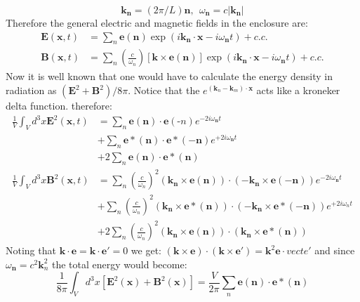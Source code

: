 \documentclass[9pt,a4paper, twocolumn]{article}
\newcommand{\vect}[1]{\textbf{#1}}
\begin{document}
        \begin{equation}
            \vect k_{\vect n} = (2\pi/L)\vect n, \ \ \omega_{\vect n} = c |\vect k_{\vect n}|
        \end{equation}
        Therefore the general electric and magnetic fields in the enclosure are:
        \begin{align}
            \vect E(\vect x, t) &= \sum_n \vect e(\vect n) \exp(i\vect k_{\vect n}\cdot \vect x - i\omega_{\vect n}t) + c.c.\\
            \vect B(\vect x,t) &= \sum_n \left(\frac c{\omega_n}\right)\left[\vect k\times \vect e(\vect n)\right]\exp(i\vect k_{\vect n}\cdot \vect x - i\omega_{\vect n} t) + c.c.
        \end{align}
        Now it is well known that one would have to calculate the energy density in radiation as $(\vect E^2 + \vect B^2)/8\pi$. Notice that the $e^{(\vect k_n - \vect k_m)\cdot \vect x}$ acts like a kroneker delta function. therefore:
        \begin{align*}
            \frac 1V \int_V d^3x \vect E^2(\vect x , t) &= \sum_n \vect e(\vect n) \cdot \vect e(\vect -n) e^{-2i\omega_{\vect n}t}\\
            & + \sum_n \vect e*(\vect n)\cdot \vect e*(-\vect n)e^{+2i\omega_{\vect n}t}\\
            & + 2\sum_n \vect e(\vect n)\cdot \vect e*(\vect n)\\
            \frac1V\int_V d^3x\vect B^2(\vect x, t) &= \sum_n \left( \frac c{\omega_n}\right)^2 (\vect k_{\vect n}\times \vect e(\vect n))\cdot (-\vect k_{\vect n}\times\vect e(-\vect n))e^{-2i\omega_{\vect n}t}\\
            & + \sum_n \left( \frac c{\omega_n}\right)^2(\vect k_{\vect n } \times \vect e*(\vect n))\cdot (-\vect k_{\vect n }\times \vect e*(-\vect n))e^{+2i\omega_n t}\\
            &+2 \sum_n \left( \frac c{\omega_n}\right)^2(\vect k_{\vect n}\times\vect e(\vect n))\cdot(\vect k_{\vect n}\times \vect e*(\vect n))
        \end{align*}
        Noting that $\vect k\cdot \vect e = \vect k\cdot \vect e' = 0$ we get: $(\vect k\times \vect e)\cdot(\vect k\times \vect e') = \vect k^2 \vect e\cdot vect e'$ and since $\omega_{\vect n} = c^2 \vect k^2_n$ the total energy would become:
        \begin{equation}
            \frac{1}{8\pi}\int_V d^3x \left[\vect E^2(\vect x) + \vect B^2(\vect x)\right] = \frac{V}{2\pi}\sum_n \vect e(\vect n)\cdot\vect e*(\vect n)
        \end{equation} 
\end{document}
